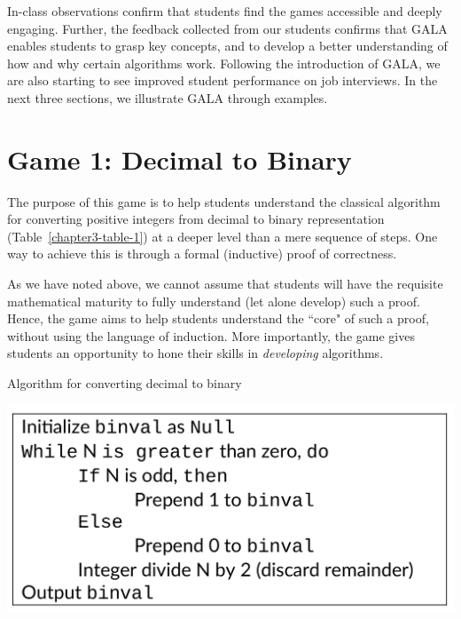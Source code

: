 \begin{multicols}{2}
In-class observations confirm that students find the games accessible and deeply engaging. Further, the feedback collected from our students confirms that GALA enables students to grasp key concepts, and to develop a better understanding of how and why certain algorithms work. Following the introduction of GALA, we are also starting to see improved student performance on job interviews. In the next three sections, we illustrate GALA through examples.

\vspace{-.3cm}

\section{Game 1: Decimal to Binary}\label{section-3}  

\vspace{-.2cm}

The purpose of this game is to help students understand the classical algorithm for converting positive integers from decimal to binary representation (Table~\ref{chapter3-table-1}) at a deeper level than a mere sequence of steps. One way to achieve this is through a formal (inductive) proof of correctness.
  
As we have noted above, we cannot assume that students will have the requisite mathematical maturity to fully understand (let alone develop) such a proof. Hence, the game aims to help students understand the ``core" of such a proof, without using the language of induction. More importantly, the game gives students an opportunity to hone their skills in \textit{developing} algorithms. 
\begin{table}[H]
\vspace{-.3cm}
\centering
\caption{Algorithm for converting decimal to binary}\label{chapter3-table-1}
\includegraphics[scale=.9]{src/Figures/chap2/table1.jpg}

\vspace{-.5cm}


\end{table}
\end{multicols}
